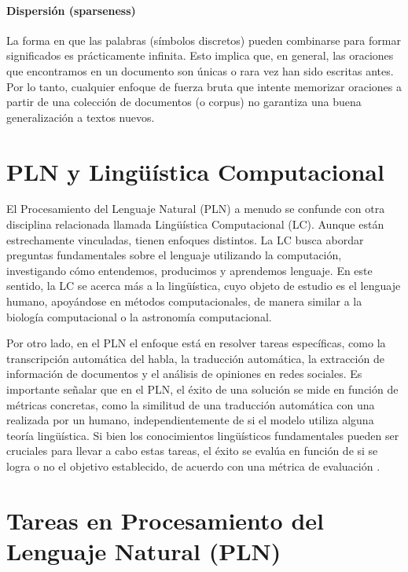 \paragraph{Dispersión (sparseness)}

La forma en que las palabras (símbolos discretos) pueden combinarse para formar significados es prácticamente infinita. Esto implica que, en general, las oraciones que encontramos en un documento son únicas o rara vez han sido escritas antes. Por lo tanto, cualquier enfoque de fuerza bruta que intente memorizar oraciones a partir de una colección de documentos (o corpus) no garantiza una buena generalización a textos nuevos.






\section{PLN y Lingüística Computacional}

El Procesamiento del Lenguaje Natural (PLN) a menudo se confunde con otra disciplina relacionada llamada Lingüística Computacional (LC). Aunque están estrechamente vinculadas, tienen enfoques distintos. La LC busca abordar preguntas fundamentales sobre el lenguaje utilizando la computación, investigando cómo entendemos, producimos y aprendemos lenguaje. En este sentido, la LC se acerca más a la lingüística, cuyo objeto de estudio es el lenguaje humano, apoyándose en métodos computacionales, de manera similar a la biología computacional o la astronomía computacional.

Por otro lado, en el PLN el enfoque está en resolver tareas específicas, como la transcripción automática del habla, la traducción automática, la extracción de información de documentos y el análisis de opiniones en redes sociales. Es importante señalar que en el PLN, el éxito de una solución se mide en función de métricas concretas, como la similitud de una traducción automática con una realizada por un humano, independientemente de si el modelo utiliza alguna teoría lingüística. Si bien los conocimientos lingüísticos fundamentales pueden ser cruciales para llevar a cabo estas tareas, el éxito se evalúa en función de si se logra o no el objetivo establecido, de acuerdo con una métrica de evaluación \cite{jacobbook}.

\section{Tareas en Procesamiento del Lenguaje Natural (PLN)}

